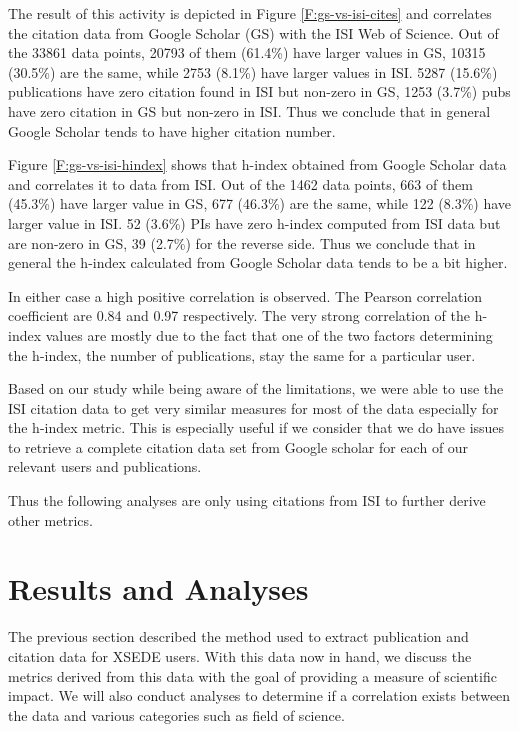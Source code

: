 \documentclass{sig-alternate}
\begin{document}
The result of this activity is depicted in Figure \ref{F:gs-vs-isi-cites} and correlates the citation data from Google Scholar (GS) with the ISI Web of Science. Out of the 33861 data points, 20793 of them (61.4\%) have larger values in GS, 10315 (30.5\%) are the same, while 2753 (8.1\%) have larger values in ISI. 5287 (15.6\%) publications have zero citation found in ISI but non-zero in GS, 1253 (3.7\%) pubs have zero citation in GS but non-zero in ISI. Thus we conclude that in general Google Scholar tends to have higher citation number. 
 
Figure \ref{F:gs-vs-isi-hindex} shows that h-index obtained from Google Scholar data and correlates it to data from ISI. Out of the 1462 data points, 663 of them (45.3\%) have larger value in GS, 677 (46.3\%) are the same, while 122 (8.3\%) have larger value in ISI. 52 (3.6\%) PIs have zero h-index computed from ISI data but are non-zero in GS, 39 (2.7\%) for the reverse side. Thus we conclude that in general the h-index calculated from Google Scholar data tends to be a bit higher. 
 
In either case a high positive correlation is observed. The Pearson correlation coefficient are 0.84 and 0.97 respectively. The very strong correlation of the h-index values are mostly due to the fact that one of the two factors determining the h-index, the number of publications, stay the same for a particular user. 
 
Based on our study while being aware of the limitations, we were able to use the ISI citation data to get very similar measures for most of the data especially for the h-index metric. This is especially useful if we consider that we do have issues to retrieve a complete citation data set from Google scholar for each of our relevant users and publications.

Thus the following analyses are only using citations from ISI to further derive other metrics. 
 
\section{Results and Analyses} \label{S:result}
 
The previous section described the method used to extract publication and citation data for XSEDE users.  With this data now in hand, we discuss the metrics derived from this data with the goal of providing a measure of scientific impact. We will also conduct analyses to determine if a correlation exists between the data and various categories such as field of science. 
 
\end{document}
